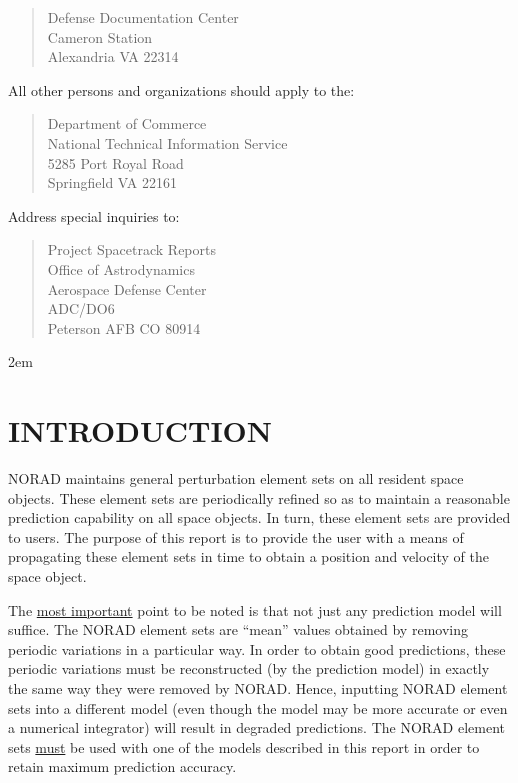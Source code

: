 \begin{quote}
Defense Documentation Center\\
Cameron Station\\
Alexandria VA  22314
\end{quote}

All other persons and organizations should apply to the:

\begin{quote}
Department of Commerce\\
National Technical Information Service\\
5285 Port Royal Road\\
Springfield VA  22161
\end{quote}

Address special inquiries to:

\begin{quote}
Project Spacetrack Reports\\
Office of Astrodynamics\\
Aerospace Defense Center\\
ADC/DO6\\
Peterson AFB CO  80914
\end{quote}
\newpage
\parindent 2em
\parskip 12pt
\section{INTRODUCTION}
NORAD maintains general perturbation element sets on all resident space
objects.  These element sets are periodically refined so as to maintain a
reasonable prediction capability on all space objects.  In turn, these element
sets are provided to users.  The purpose of this report is to provide the user
with a means of propagating these element sets in time to obtain a position
and velocity of the space object.

The \underline{most important} point to be noted is that not just any
prediction model will suffice.  The NORAD element sets are ``mean'' values
obtained by removing periodic variations in a particular way.  In order to
obtain good predictions, these periodic variations must be reconstructed (by
the prediction model) in exactly the same way they were removed by NORAD.
Hence, inputting NORAD element sets into a different model (even though the
model may be more accurate or even a numerical integrator) will result in
degraded predictions.  The NORAD element sets \underline{must} be used with
one of the models described in this report in order to retain maximum
prediction accuracy.

